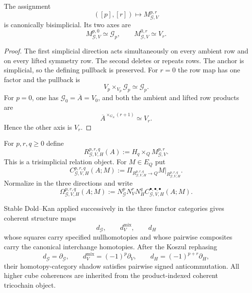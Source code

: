 \begin{theorem}
\label{thm:symmetry-noether-bisimplicial-mixed-relation}
The assignment
\[
([p],[r])\longmapsto M_{\mathcal G,V}^{p,r}
\]
is canonically bisimplicial.  Its two axes are
\[
M_{\mathcal G,V}^{p,0}\simeq\mathcal G_p,
\qquad
M_{\mathcal G,V}^{0,r}\simeq V_r.
\]
\end{theorem}

\begin{proof}
The first simplicial direction acts simultaneously on every ambient row and on
every lifted symmetry row.  The second deletes or repeats rows.  The anchor is
simplicial, so the defining pullback is preserved.  For $r=0$ the row map has one
factor and the pullback is
\[
V_p\times_{V_p}\mathcal G_p\simeq\mathcal G_p.
\]
For $p=0$, one has $\mathcal G_0=\overline A=V_0$, and both the ambient and lifted
row products are
\[
\overline A^{\times_{G_A}(r+1)}\simeq V_r.
\]
Hence the other axis is $V_r$.
\end{proof}

\begin{definition}
\label{def:symmetry-noether-symmetry-vertical-horizontal-triple-relation}
For $p,r,q\ge0$ define
\[
R_{\mathcal G,V,H}^{p,r,q}(A)
:=
H_q\times_QM_{\mathcal G,V}^{p,r}.
\]
This is a trisimplicial relation object.  For $M\in E_Q$ put
\[
C_{\mathcal G,V,H}^{p,r,q}(A;M)
:=
\Pi_{R_{\mathcal G,V,H}^{p,r,q}\to Q}
M|_{R_{\mathcal G,V,H}^{p,r,q}}.
\]
Normalize in the three directions and write
\[
\Omega_{\mathcal G,V,H}^{p,r,q}(A;M)
:=
N_{\mathcal G}^pN_V^rN_H^q
C_{\mathcal G,V,H}^{\bullet,\bullet,\bullet}(A;M).
\]
\end{definition}

\begin{theorem}
\label{thm:symmetry-noether-coherent-mixed-tricomplex}
Stable Dold--Kan applied successively in the three functor categories gives
coherent structure maps
\[
d_{\mathcal G},\qquad d_V^{\mathrm{mix}},\qquad d_H
\]
whose squares carry specified nullhomotopies and whose pairwise composites carry
the canonical interchange homotopies.  After the Koszul rephasing
\[
d_{\mathcal G}=\partial_{\mathcal G},
\qquad
d_V^{\mathrm{mix}}=(-1)^p\partial_V,
\qquad
d_H=(-1)^{p+r}\partial_H,
\]
their homotopy-category shadow satisfies pairwise signed anticommutation.  All
higher cube coherences are inherited from the product-indexed coherent
tricochain object.
\end{theorem}

